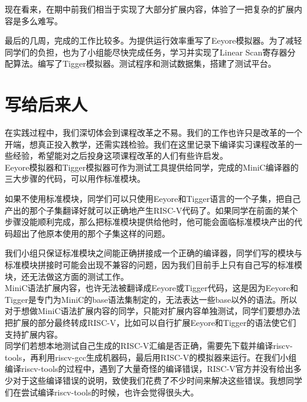 \documentclass[a4paper]{ctexart}
\begin{document}
现在看来，在期中前我们相当于实现了大部分扩展内容，体验了一把复杂的扩展内容是多么难写。

最后的几周，完成的工作比较多。为提供运行效率重写了Eeyore模拟器。为了减轻同学们的负担，也为了小组能尽快完成任务，学习并实现了Linear Scan寄存器分配算法。编写了Tigger模拟器。测试程序和测试数据集，搭建了测试平台。

\newpage
\section{写给后来人}

在实践过程中，我们深切体会到课程改革之不易。我们的工作也许只是改革的一个开端，想真正投入教学，还需实践检验。我们在这里记录下编译实习课程改革的一些经验，希望能对之后投身这项课程改革的人们有些许启发。
\\

Eeyore模拟器和Tigger模拟器可作为测试工具提供给同学，完成的MiniC编译器的三大步骤的代码，可以用作标准模块。

如果不使用标准模块，同学们可以只使用Eeyore和Tigger语言的一个子集，把自己产出的那个子集翻译好就可以正确地产生RISC-V代码了。如果同学在前面的某个步骤没能顺利完成，那么把标准模块提供给他时，他可能会面临标准模块产出的代码超出了他原本使用的那个子集这样的问题。

我们小组只保证标准模块之间能正确拼接成一个正确的编译器，同学们写的模块与标准模块拼接时可能会出现不兼容的问题，因为我们目前手上只有自己写的标准模块，还无法做这方面的测试工作。
\\

MiniC语法扩展内容，也许无法被翻译成Eeyore或Tigger代码，这是因为Eeyore和Tigger是专门为MiniC的base语法集制定的，无法表达一些base以外的语法。所以对于想做MiniC语法扩展内容的同学，只能对扩展内容单独测试，同学们要想办法把扩展的部分最终转成RISC-V，比如可以自行扩展Eeyore和Tigger的语法使它们支持扩展内容。
\\

同学们若想本地测试自己生成的RISC-V汇编是否正确，需要先下载并编译riscv-tools，再利用riscv-gcc生成机器码，最后用RISC-V的模拟器来运行。在我们小组编译riscv-tools的过程中，遇到了大量奇怪的编译错误，RISC-V官方并没有给出多少对于这些编译错误的说明，致使我们花费了不少时间来解决这些错误。我想同学们在尝试编译riscv-tools的时候，也许会觉得很头大。
\end{document}
